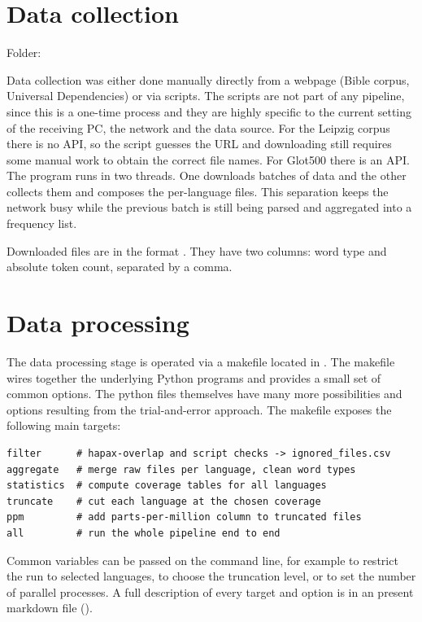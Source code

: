 \newpage

\section{Data collection}

Folder: 

Data collection was either done manually directly from a webpage (Bible corpus, Universal Dependencies) or via scripts. The scripts are not part of any pipeline, since this is a one-time process and they are highly specific to the current setting of the receiving PC, the network and the data source. For the Leipzig corpus there is no API, so the script guesses the URL and downloading still requires some manual work to obtain the correct file names. For Glot500 there is an API. The program runs in two threads. One downloads batches of data and the other collects them and composes the per-language files. This separation keeps the network busy while the previous batch is still being parsed and aggregated into a frequency list.

Downloaded files are in the format . They have two columns: word type and absolute token count, separated by a comma.

\section{Data processing}
\label{sec:impl_processing}

The data processing stage is operated via a makefile located in . The makefile wires together the underlying Python programs and provides a small set of common options. The python files themselves have many more possibilities and options resulting from the trial-and-error approach. The makefile exposes the following main targets:

\begin{lstlisting}
filter      # hapax-overlap and script checks -> ignored_files.csv
aggregate   # merge raw files per language, clean word types
statistics  # compute coverage tables for all languages
truncate    # cut each language at the chosen coverage
ppm         # add parts-per-million column to truncated files
all         # run the whole pipeline end to end
\end{lstlisting}

Common variables can be passed on the command line, for example  to restrict the run to selected languages,  to choose the truncation level, or  to set the number of parallel processes. A full description of every target and option is in an present markdown file ().

